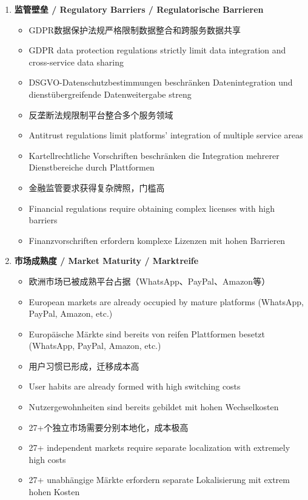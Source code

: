 \documentclass[11pt,a4paper]{article}
\begin{document}
\begin{enumerate}
    \item \textbf{监管壁垒 / Regulatory Barriers / Regulatorische Barrieren}
    \begin{itemize}
        \item GDPR数据保护法规严格限制数据整合和跨服务数据共享
        \item GDPR data protection regulations strictly limit data integration and cross-service data sharing
        \item DSGVO-Datenschutzbestimmungen beschränken Datenintegration und dienstübergreifende Datenweitergabe streng
        \item 反垄断法规限制平台整合多个服务领域
        \item Antitrust regulations limit platforms' integration of multiple service areas
        \item Kartellrechtliche Vorschriften beschränken die Integration mehrerer Dienstbereiche durch Plattformen
        \item 金融监管要求获得复杂牌照，门槛高
        \item Financial regulations require obtaining complex licenses with high barriers
        \item Finanzvorschriften erfordern komplexe Lizenzen mit hohen Barrieren
    \end{itemize}
    
    \item \textbf{市场成熟度 / Market Maturity / Marktreife}
    \begin{itemize}
        \item 欧洲市场已被成熟平台占据（WhatsApp、PayPal、Amazon等）
        \item European markets are already occupied by mature platforms (WhatsApp, PayPal, Amazon, etc.)
        \item Europäische Märkte sind bereits von reifen Plattformen besetzt (WhatsApp, PayPal, Amazon, etc.)
        \item 用户习惯已形成，迁移成本高
        \item User habits are already formed with high switching costs
        \item Nutzergewohnheiten sind bereits gebildet mit hohen Wechselkosten
        \item 27+个独立市场需要分别本地化，成本极高
        \item 27+ independent markets require separate localization with extremely high costs
        \item 27+ unabhängige Märkte erfordern separate Lokalisierung mit extrem hohen Kosten
    \end{itemize}
    

\end{enumerate}
\end{document}
